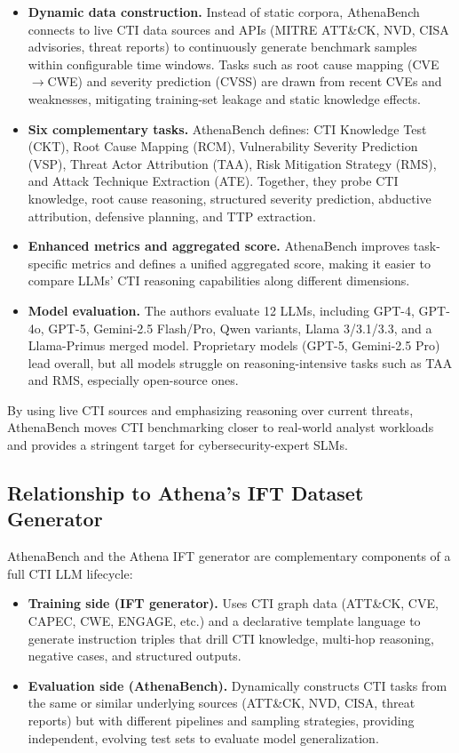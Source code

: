 \documentclass[10pt]{article}
\begin{document}
\begin{itemize}[leftmargin=*]
  \item \textbf{Dynamic data construction.} Instead of static corpora, AthenaBench connects to live CTI data sources and APIs (MITRE ATT\&CK, NVD, CISA advisories, threat reports) to continuously generate benchmark samples within configurable time windows. Tasks such as root cause mapping (CVE$\rightarrow$CWE) and severity prediction (CVSS) are drawn from recent CVEs and weaknesses, mitigating training-set leakage and static knowledge effects.\cite{alam2025athenabench}
  \item \textbf{Six complementary tasks.} AthenaBench defines: CTI Knowledge Test (CKT), Root Cause Mapping (RCM), Vulnerability Severity Prediction (VSP), Threat Actor Attribution (TAA), Risk Mitigation Strategy (RMS), and Attack Technique Extraction (ATE). Together, they probe CTI knowledge, root cause reasoning, structured severity prediction, abductive attribution, defensive planning, and TTP extraction.\cite{alam2025athenabench}
  \item \textbf{Enhanced metrics and aggregated score.} AthenaBench improves task-specific metrics and defines a unified aggregated score, making it easier to compare LLMs’ CTI reasoning capabilities along different dimensions.\cite{alam2025athenabench}
  \item \textbf{Model evaluation.} The authors evaluate 12 LLMs, including GPT-4, GPT-4o, GPT-5, Gemini-2.5 Flash/Pro, Qwen variants, Llama 3/3.1/3.3, and a Llama-Primus merged model. Proprietary models (GPT-5, Gemini-2.5 Pro) lead overall, but all models struggle on reasoning-intensive tasks such as TAA and RMS, especially open-source ones.\cite{alam2025athenabench}
\end{itemize}

By using live CTI sources and emphasizing reasoning over current threats, AthenaBench moves CTI benchmarking closer to real-world analyst workloads and provides a stringent target for cybersecurity-expert SLMs.

\subsection{Relationship to Athena’s IFT Dataset Generator}

AthenaBench and the Athena IFT generator are complementary components of a full CTI LLM lifecycle:

\begin{itemize}[leftmargin=*]
  \item \textbf{Training side (IFT generator).} Uses CTI graph data (ATT\&CK, CVE, CAPEC, CWE, ENGAGE, etc.) and a declarative template language to generate instruction triples that drill CTI knowledge, multi-hop reasoning, negative cases, and structured outputs.\cite{cardei2025ift}
  \item \textbf{Evaluation side (AthenaBench).} Dynamically constructs CTI tasks from the same or similar underlying sources (ATT\&CK, NVD, CISA, threat reports) but with different pipelines and sampling strategies, providing independent, evolving test sets to evaluate model generalization.\cite{alam2025athenabench}
\end{itemize}
\end{document}
